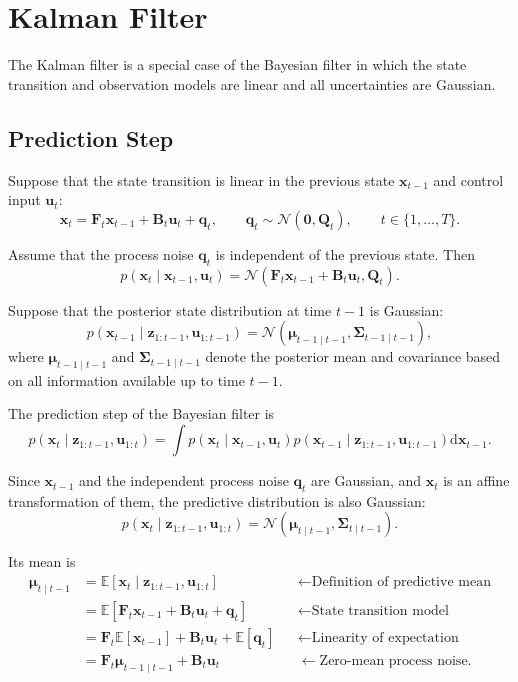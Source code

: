 \documentclass[../Bayesian_Inference.tex]{subfiles}
\begin{document}
\section{Kalman Filter}

The Kalman filter is a special case of the Bayesian filter in which the state transition and observation models are linear and all uncertainties are Gaussian.

\subsection{Prediction Step}

Suppose that the state transition is linear in the previous state $\bm{x}_{t-1}$ and control input $\bm{u}_t$:
\[
    \bm{x}_t = \mathbf{F}_{t}\bm{x}_{t-1} + \mathbf{B}_{t}\bm{u}_{t} + \bm{q}_t,
    \qquad
    \bm{q}_t \sim \mathcal{N}(\bm{0},\mathbf{Q}_t),
    \qquad
    t\in\{1,\dots,T\}.
\]

Assume that the process noise $\bm{q}_t$ is independent of the previous state. Then
\[
    p(\bm{x}_t\mid\bm{x}_{t-1},\bm{u}_t)=\mathcal{N}\left(\mathbf{F}_t\bm{x}_{t-1} + \mathbf{B}_t\bm{u}_t,\mathbf{Q}_t\right).
\]

Suppose that the posterior state distribution at time $t-1$ is Gaussian:
\[
    p(\bm{x}_{t-1}\mid\bm{z}_{1:t-1},\bm{u}_{1:t-1})=\mathcal{N}\left(\bm{\mu}_{t-1\mid t-1},\mathbf{\Sigma}_{t-1\mid t-1}\right),
\]
where $\bm{\mu}_{t-1\mid t-1}$ and $\mathbf{\Sigma}_{t-1\mid t-1}$ denote the posterior mean and covariance based on all information available up to time $t-1$.

The prediction step of the Bayesian filter is
\[
    p(\bm{x}_t\mid\bm{z}_{1:t-1},\bm{u}_{1:t})=\int p(\bm{x}_t\mid\bm{x}_{t-1},\bm{u}_t)p(\bm{x}_{t-1}\mid\bm{z}_{1:t-1},\bm{u}_{1:t-1})\mathrm{d}\bm{x}_{t-1}.
\]

Since $\bm{x}_{t-1}$ and the independent process noise $\bm{q}_t$ are Gaussian, and $\bm{x}_t$ is an affine transformation of them, the predictive distribution is also Gaussian:
\[
    p(\bm{x}_t\mid\bm{z}_{1:t-1},\bm{u}_{1:t}) = \mathcal{N}\left( \bm{\mu}_{t\mid t-1}, \mathbf{\Sigma}_{t\mid t-1} \right).
\]

Its mean is
\[
\begin{aligned}
    \bm{\mu}_{t\mid t-1}
    &= \mathbb{E}[\bm{x}_t\mid\bm{z}_{1:t-1},\bm{u}_{1:t}] &&\leftarrow \text{Definition of predictive mean} \\
    &= \mathbb{E}[\mathbf{F}_t\bm{x}_{t-1}+\mathbf{B}_t\bm{u}_t+\bm{q}_t] &&\leftarrow \text{State transition model} \\
    &= \mathbf{F}_t\mathbb{E}[\bm{x}_{t-1}] + \mathbf{B}_t\bm{u}_t + \mathbb{E}[\bm{q}_t] &&\leftarrow \text{Linearity of expectation} \\
    &= \mathbf{F}_t\bm{\mu}_{t-1\mid t-1}
    + \mathbf{B}_t\bm{u}_t &&\leftarrow \text{Zero-mean process noise}.
\end{aligned}
\]
\end{document}
